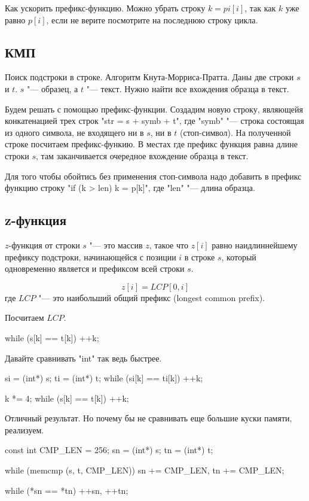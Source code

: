 Как ускорить префикс-функцию.
Можно убрать строку $k = pi[i]$, так как $k$ уже равно $p[i]$, если не верите посмотрите на последнюю строку цикла.

\subsection{КМП}
Поиск подстроки в строке. Алгоритм Кнута-Морриса-Пратта.
Даны две строки $s$ и $t$. $s$ "--- образец, а $t$ "--- текст. 
Нужно найти все вхождения образца в текст. 

Будем решать с помощью префикс-функции. 
Создадим новую строку, являющейя конкатенацией трех строк \cpp"str = s + symb + t", где \cpp"symb" "--- строка состоящая из одного символа, не входящего ни в $s$, ни в $t$ (стоп-символ). 
На полученной строке посчитаем префикс-функию. 
В местах где префикс функция равна длине строки $s$, там заканчивается очередное вхождение образца в текст.

Для того чтобы обойтись без применения стоп-символа надо добавить в префикс функцию строку \cpp"if (k > len) k = p[k]", где \cpp"len" "--- длина образца.

\subsection{z-функция}
$z$-функция от строки $s$ "--- это массив $z$, такое что $z[i]$ равно наидлиннейшему префиксу подстроки, начинающейся с позиции $i$ в строке $s$, который одновременно является и префиксом всей строки $s$.

$$z[i] = LCP[0,i]$$
где $LCP$ "--- это наибольший общий префикс (longest common prefix).

Посчитаем $LCP$.

\begin{cppcode}
while (s[k] == t[k])
  ++k;
\end{cppcode}

Давайте сравнивать \cpp"int" так ведь быстрее.

\begin{cppcode}
si = (int*) s;
ti = (int*) t;
while (si[k] == ti[k])
  ++k;

k *= 4;
while (s[k] == t[k])
  ++k;
\end{cppcode} 

Отличный результат. 
Но почему бы не сравнивать еще большие куски памяти, реализуем.


\begin{cppcode}
const int CMP_LEN = 256;
sn = (int*) s;
tn = (int*) t;

while (memcmp (s, t, CMP_LEN))
  sn += CMP_LEN, 
  tn += CMP_LEN;

while (*sn == *tn)
  ++sn, 
  ++tn;
\end{cppcode} 